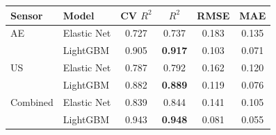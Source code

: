 \begin{tabular}{llcccc}
\toprule
Sensor & Model & CV $R^2$ & $R^2$ & RMSE & MAE \\
\midrule
AE & Elastic Net & 0.727 & 0.737 & 0.183 & 0.135 \\
 & LightGBM & 0.905 & \textbf{0.917} & 0.103 & 0.071 \\
\midrule
US & Elastic Net & 0.787 & 0.792 & 0.162 & 0.120 \\
 & LightGBM & 0.882 & \textbf{0.889} & 0.119 & 0.076 \\
\midrule
Combined & Elastic Net & 0.839 & 0.844 & 0.141 & 0.105 \\
 & LightGBM & 0.943 & \textbf{0.948} & 0.081 & 0.055 \\
\bottomrule
\end{tabular}
